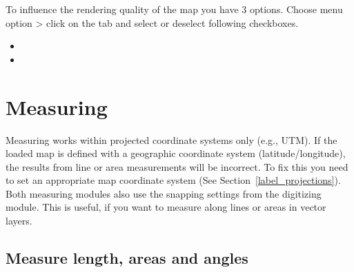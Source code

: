 \label{label_renderquality}

To influence the rendering quality of the map you have 3 options. Choose menu 
option  >  click on the 
 tab and select or deselect following checkboxes.

\begin{itemize}
\item {}
\item {}
\end{itemize}

\section{Measuring}\label{sec:measure}

Measuring works within projected coordinate systems only (e.g., UTM). If 
the loaded map is defined with a geographic coordinate system
(latitude/longitude), the results from line or area measurements will be 
incorrect. To fix this you need to set an appropriate map coordinate system 
(See Section~\ref{label_projections}). Both measuring modules also use the 
snapping settings from the digitizing module. This is useful, if you want to 
measure along lines or areas in vector layers.  

\subsection{Measure length, areas and angles}

